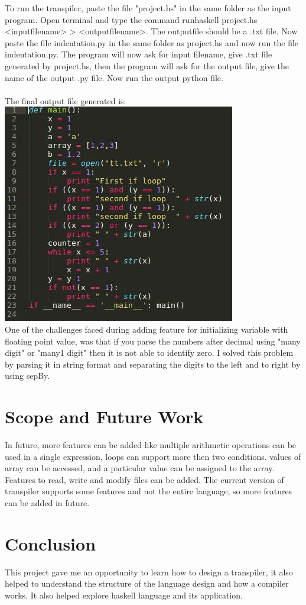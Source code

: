\documentclass{article}
\begin{document}
To run the transpiler, paste the file "project.hs" in the same folder as the input program. Open terminal and type the command runhaskell project.hs <inputfilename> > <outputfilename>. The outputfile should be a .txt file. Now paste the file indentation.py in the same folder as project.hs and now run the file indentation.py. The program will now ask for input filename, give .txt file generated by project.hs, then the program will ask for the output file, give the name of the output .py file. Now run the output python file.\\
\\
The final output file generated is:\\
\includegraphics{la1}
\\
One of the challenges faced during adding feature for initializing variable with floating point value, was that if you parse the numbers after decimal using "many digit" or "many1 digit" then it is not able to identify zero. I solved this problem by parsing it in string format and separating the digits to the left and to right by using sepBy.


\section{Scope and Future Work}
In future, more features can be added like multiple arithmetic operations can be used in a single expression, loops can support more then two conditions. values of array can be accessed, and a particular value can be assigned to the array. Features to read, write and modify files can be added. The current version of transpiler supports some features and not the entire language, so more features can be added in future.

\section{Conclusion}
This project gave me an opportunity to learn how to design a transpiler, it also helped to understand the structure of the language design and how a compiler works. It also helped explore haskell language and its application.\



\end{document}

